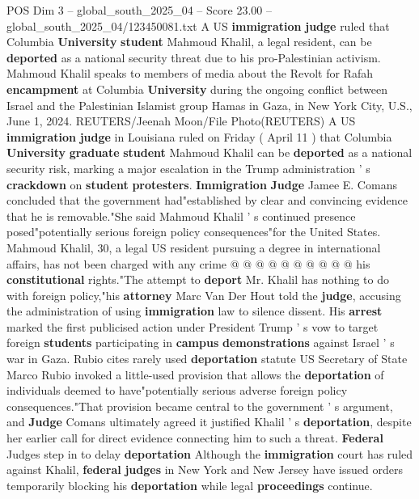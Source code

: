 \begin{textsample}{POS Dim 3 – global\_south\_2025\_04 – Score 23.00 – global\_south\_2025\_04/123450081.txt}  \label{ex:f3_pos_114}
A US \textbf{immigration} \textbf{judge} ruled that Columbia \textbf{University} \textbf{student} Mahmoud Khalil, a legal resident, can be \textbf{deported} as a national security threat due to his pro-Palestinian activism.
Mahmoud Khalil speaks to members of media about the Revolt for Rafah \textbf{encampment} at Columbia \textbf{University} during the ongoing conflict between Israel and the Palestinian Islamist group Hamas in Gaza, in New York City, U.S., June 1, 2024.
REUTERS/Jeenah Moon/File Photo(REUTERS) A US \textbf{immigration} \textbf{judge} in Louisiana ruled on Friday ( April 11 ) that Columbia \textbf{University} \textbf{graduate} \textbf{student} Mahmoud Khalil can be \textbf{deported} as a national security risk, marking a major escalation in the Trump administration ' s \textbf{crackdown} on \textbf{student} \textbf{protesters}. \textbf{Immigration} \textbf{Judge} Jamee E.
Comans concluded that the government had"established by clear and convincing evidence that he is removable."She said Mahmoud Khalil ' s continued presence posed"potentially serious foreign policy consequences"for the United States.
Mahmoud Khalil, 30, a legal US resident pursuing a degree in international affairs, has not been charged with any crime @ @ @ @ @ @ @ @ @ @ his \textbf{constitutional} rights."The attempt to \textbf{deport} Mr.
Khalil has nothing to do with foreign policy,"his \textbf{attorney} Marc Van Der Hout told the \textbf{judge}, accusing the administration of using \textbf{immigration} law to silence dissent.
His \textbf{arrest} marked the first publicised action under President Trump ' s vow to target foreign \textbf{students} participating in \textbf{campus} \textbf{demonstrations} against Israel ' s war in Gaza.
Rubio cites rarely used \textbf{deportation} statute US Secretary of State Marco Rubio invoked a little-used provision that allows the \textbf{deportation} of individuals deemed to have"potentially serious adverse foreign policy consequences."That provision became central to the government ' s argument, and \textbf{Judge} Comans ultimately agreed it justified Khalil ' s \textbf{deportation}, despite her earlier call for direct evidence connecting him to such a threat. \textbf{Federal} Judges step in to delay \textbf{deportation} Although the \textbf{immigration} court has ruled against Khalil, \textbf{federal} \textbf{judges} in New York and New Jersey have issued orders temporarily blocking his \textbf{deportation} while legal \textbf{proceedings} continue.

\end{textsample}
